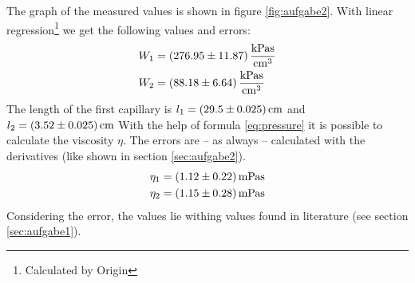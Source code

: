 The graph of the measured values is shown in figure \ref{fig:aufgabe2}. With linear regression\footnote{Calculated by Origin} we get the following values and errors:
\begin{align*}
W_1 &= \unit[(276.95 \pm 11.87)]{\frac{kPa s}{cm^3}}\\
W_2 &= \unit[(88.18 \pm 6.64)]{\frac{kPa s}{cm^3}}
\end{align*}
The length of the first capillary is $l_1 = \unit[(29.5 \pm 0.025)]{cm}$ and $l_2 = \unit[(3.52 \pm 0.025)]{cm}$
With the help of formula \ref{eq:pressure} it is possible to calculate the viscosity $\eta$. The errors are -- as always -- calculated with the derivatives (like shown in section \ref{sec:aufgabe2}).
\begin{align*}
\eta_1 &= \unit[(1.12 \pm 0.22)]{mPa s}   \\
\eta_2 &= \unit[(1.15 \pm 0.28)]{mPa s}
\end{align*}
Considering the error, the values lie withing values found in literature (see section \ref{sec:aufgabe1}).




